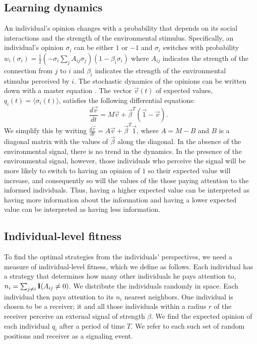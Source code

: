 \documentclass{article}
\begin{document}
\subsection{Learning dynamics }
An individual's opinion changes with a probability that depends on its social interactions and the strength of the environmental stimulus. Specifically, an individual's opinion $\sigma_i$ can be either $1$ or $-1$ and $\sigma_i$ switches with probability $w_i(\sigma_i)=\frac{1}{2}(-\sigma_i\sum_jA_{ij}\sigma_j )(1-\beta_i\sigma_i)$ where $A_{ij}$ indicates the strength of the connection from $j$ to $i$ and $\beta_i$ indicates the strength of the environmental stimulus perceived by $i$.  The stochastic dynamics of the opinions can be written down with a master equation \cite{Glauber:1963fk}.  The vector $\vec{v}(t)$ of expected values, $q_i(t)=\langle \sigma_i(t)\rangle$, satisfies the following differential equations: \cite{Glauber:1963fk}
\begin{equation*}
\frac{d\vec{v}}{dt}=M\vec{v}+\vec{\beta}^T(\vec{1}-\vec{v}).
\end{equation*}
We simplify this by writing $\frac{d\vec{v}}{dt}=A\vec{v}+\vec{\beta}^T\vec{1}$, where $A=M-B$ and $B$ is a diagonal matrix with the values of $\vec{\beta}$ along the diagonal. In the absence of the environmental signal, there is no trend in the dynamics. In the presence of the environmental signal, however, those individuals who perceive the signal will be more likely to switch to having an opinion of $1$ so their expected value will increase, and consequently so will the values of the those paying attention to the informed individuals. Thus, having a higher expected value can be interpreted as having more information about the information and having a lower expected value can be interpreted as having less information.

\subsection{Individual-level fitness }
To find the optimal strategies from the individuals' perspectives, we need a measure of individual-level fitness, which we define as follows. Each individual has a strategy that determines how many other individuals he pays attention to, $n_i=\sum_{j\neq i}{\bf I}(A_{ij}\neq 0)$.  We distribute the individuals randomly in space.  Each individual then pays attention to its $n_i$ nearest neighbors.  One individual is chosen to be a receiver; it and all those individuals within a radius $r$ of the receiver perceive an external signal of strength $\beta$.  We find the expected opinion of each individual $q_i$ after a period of time $T$.  We refer to each such set of random positions and receiver as a signaling event. 
\end{document}
